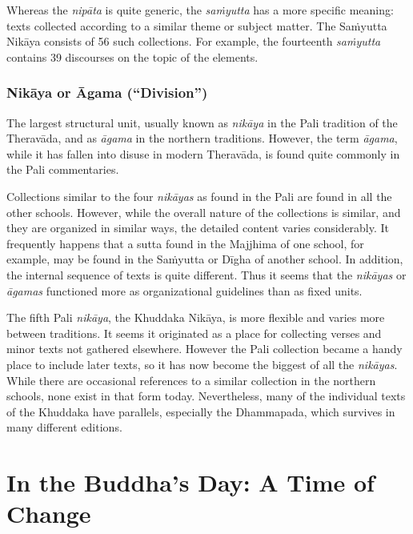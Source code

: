 \documentclass[12pt,openany]{book}%
\begin{document}
Whereas the \textit{\textsanskrit{nipāta}} is quite generic, the \textit{\textsanskrit{saṁyutta}} has a more specific meaning: texts collected according to a similar theme or subject matter. The \textsanskrit{Saṁyutta} \textsanskrit{Nikāya} consists of 56 such collections. For example, the fourteenth \textit{\textsanskrit{saṁyutta}} contains 39 discourses on the topic of the elements.

\subsubsection*{\textsanskrit{Nikāya} or Āgama (“Division”)}

The largest structural unit, usually known as \textit{\textsanskrit{nikāya}} in the Pali tradition of the \textsanskrit{Theravāda}, and as \textit{\textsanskrit{āgama}} in the northern traditions. However, the term \textit{\textsanskrit{āgama}}, while it has fallen into disuse in modern \textsanskrit{Theravāda}, is found quite commonly in the Pali commentaries.

Collections similar to the four \textit{\textsanskrit{nikāyas}} as found in the Pali are found in all the other schools. However, while the overall nature of the collections is similar, and they are organized in similar ways, the detailed content varies considerably. It frequently happens that a sutta found in the Majjhima of one school, for example, may be found in the \textsanskrit{Saṁyutta} or \textsanskrit{Dīgha} of another school. In addition, the internal sequence of texts is quite different. Thus it seems that the \textit{\textsanskrit{nikāyas}} or \textit{\textsanskrit{āgamas}} functioned more as organizational guidelines than as fixed units.

The fifth Pali \textit{\textsanskrit{nikāya}}, the Khuddaka \textsanskrit{Nikāya}, is more flexible and varies more between traditions. It seems it originated as a place for collecting verses and minor texts not gathered elsewhere. However the Pali collection became a handy place to include later texts, so it has now become the biggest of all the \textit{\textsanskrit{nikāyas}}. While there are occasional references to a similar collection in the northern schools, none exist in that form today. Nevertheless, many of the individual texts of the Khuddaka have parallels, especially the Dhammapada, which survives in many different editions.

\section*{In the Buddha’s Day: A Time of Change}
\end{document}

